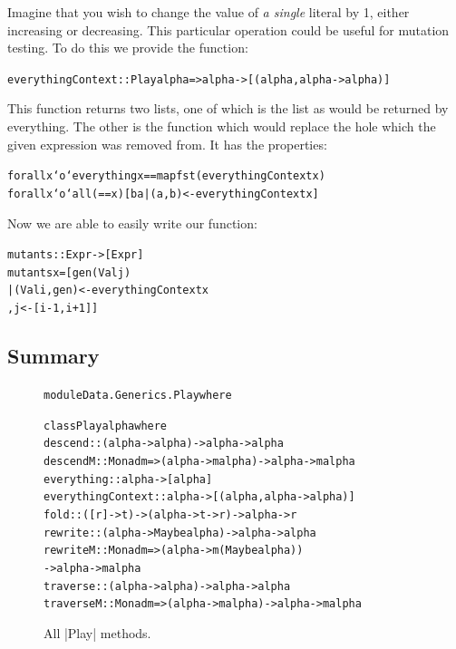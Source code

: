 \documentclass[preprint]{sigplanconf}
\newenvironment{code}{\begin{alltt}\small}{\end{alltt}}
\begin{document}
Imagine that you wish to change the value of \textit{a single} literal by 1, either increasing or decreasing. This particular operation could be useful for mutation testing. To do this we provide the function:

\begin{code}
everythingContext :: Play alpha => alpha -> [(alpha, alpha -> alpha)]
\end{code}

This function returns two lists, one of which is the list as would be returned by everything. The other is the function which would replace the hole which the given expression was removed from. It has the properties:

\begin{code}
forall x `o` everything x == map fst (everythingContext x)
forall x `o` all (== x) [b a | (a,b) <- everythingContext x]
\end{code}

Now we are able to easily write our function:

\begin{code}
mutants :: Expr -> [Expr]
mutants x =  [gen (Val j)
             | (Val i, gen) <- everythingContext x
             , j <- [i-1, i+1]]
\end{code}


\subsection{Summary}

\begin{figure}
\begin{code}
module Data.Generics.Play where

class Play alpha where
    descend            :: (alpha -> alpha) -> alpha -> alpha
    descendM           :: Monad m => (alpha -> m alpha) -> alpha -> m alpha
    everything         :: alpha -> [alpha]
    everythingContext  :: alpha -> [(alpha, alpha -> alpha)]
    fold               :: ([r] -> t) -> (alpha -> t -> r) -> alpha -> r
    rewrite            :: (alpha -> Maybe alpha) -> alpha -> alpha
    rewriteM           :: Monad m  => (alpha -> m (Maybe alpha))
                                   -> alpha -> m alpha
    traverse           :: (alpha -> alpha) -> alpha -> alpha
    traverseM          :: Monad m => (alpha -> m alpha) -> alpha -> m alpha
\end{code}
\caption{All |Play| methods.}
\label{fig:play}
\end{figure}
\end{document}
